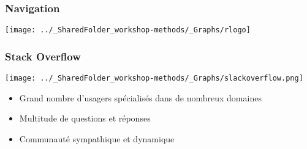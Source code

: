 \documentclass{beamer}
\begin{document}

    \begin{frame}
    
      \frametitle{Navigation} \vspace{1cm}
      
          \begin{center}
          
        \texttt{[image: ../\_SharedFolder\_workshop-methods/\_Graphs/rlogo]}

          \end{center}
          
    \end{frame}


    \begin{frame}
    
      \frametitle{Stack Overflow} \vspace{1cm}
      
        \begin{center}
          
        \texttt{[image: ../\_SharedFolder\_workshop-methods/\_Graphs/slackoverflow.png]}

         \end{center}
          
        \begin{itemize}
         \item Grand nombre d'usagers spécialisés dans de nombreux domaines
         \item Multitude de questions et réponses
         \item Communauté sympathique et dynamique
            
        \end{itemize}
          
    \end{frame}

\end{document}

